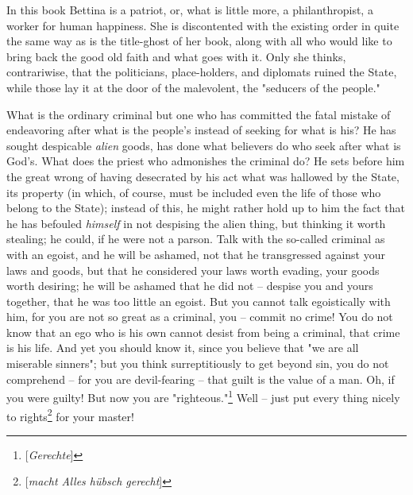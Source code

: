 \documentclass[a4paper]{book}
\begin{document}
In this book Bettina is a patriot, or, what is little more, a philanthropist, 
a worker for human happiness. She is discontented with the existing order in 
quite the same way as is the title-ghost of her book, along with all who would 
like to bring back the good old faith and what goes with it. Only she thinks, 
contrariwise, that the politicians, place-holders, and diplomats ruined the 
State, while those lay it at the door of the malevolent, the "{}seducers of 
the people."{}

What is the ordinary criminal but one who has committed the fatal mistake of 
endeavoring after what is the people's instead of seeking for what is his? He 
has sought despicable \textit{alien} goods, has done what believers do who 
seek after what is God's. What does the priest who admonishes the criminal do? 
He sets before him the great wrong of having desecrated by his act what was 
hallowed by the State, its property (in which, of course, must be included 
even the life of those who belong to the State); instead of this, he might 
rather hold up to him the fact that he has befouled \textit{himself} in not 
despising the alien thing, but thinking it worth stealing; he could, if he 
were not a parson. Talk with the so-called criminal as with an egoist, and he 
will be ashamed, not that he transgressed against your laws and goods, but 
that he considered your laws worth evading, your goods worth desiring; he will 
be ashamed that he did not -- despise you and yours together, that he was too 
little an egoist. But you cannot talk egoistically with him, for you are not 
so great as a criminal, you -- commit no crime! You do not know that an ego 
who is his own cannot desist from being a criminal, that crime is his life. 
And yet you should know it, since you believe that "{}we are all miserable 
sinners"{}; but you think surreptitiously to get beyond sin, you do not 
comprehend -- for you are devil-fearing -- that guilt is the value of a man. 
Oh, if you were guilty! But now you are 
"{}righteous."{}\footnote{[\textit{Gerechte}]} Well -- just put every thing 
nicely to rights\footnote{[\textit{macht Alles h\"ubsch gerecht}]} for your 
master!
\end{document}
